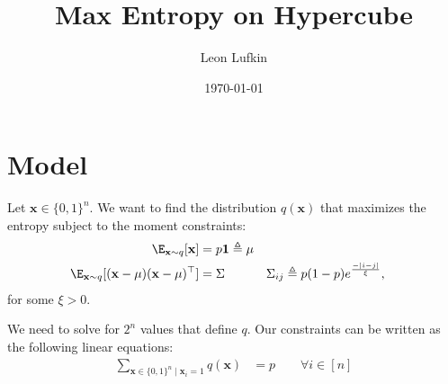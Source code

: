 \documentclass{article}
\title{Max Entropy on Hypercube}
\author{Leon Lufkin}
\date{\today}
\begin{document}
\section{Model}
Let $\mathbf{x} \in \{0,1\}^n$.
We want to find the distribution $q(\mathbf{x})$ that maximizes the entropy subject to the moment constraints:
\begin{align}
  \E_{\mathbf{x} \sim q} [ \mathbf{x} ] &= p \mathbf{1} \triangleq \mu \label{eq:mean_constraint} \\
  \E_{\mathbf{x} \sim q} [ ( \mathbf{x} - \mu ) ( \mathbf{x} - \mu )^\top ] &= \Sigma && \Sigma_{ij} \triangleq p(1-p) e^{\frac{-|i-j|}{\xi}},  \label{eq:covariance_constraint}
\end{align}
for some $\xi > 0$.

We need to solve for $2^n$ values that define $q$.
Our constraints can be written as the following linear equations:
\begin{align}
  \sum_{\mathbf{x} \in \{0,1\}^n \mid \mathbf{x}_i = 1} q(\mathbf{x}) &= p \qquad \forall i \in [n] \\
\end{align}
\end{document}
